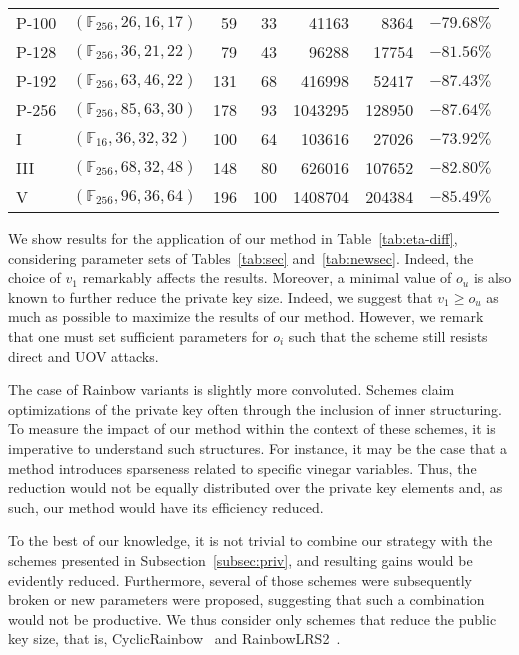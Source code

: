 \documentclass[12pt, a4paper, oneside]{memoir}
\theoremstyle{definition}
\begin{document}
\begin{table}[htbp]
\begin{tabular}{*{2}{l}*{5}{r}}
    P-100 & $(\mathbb{F}_{256}, 26, 16, 17)$ &  59 &  33 & \num{   41163} & \num{   8364} & $-79.68\%$ \\
    P-128 & $(\mathbb{F}_{256}, 36, 21, 22)$ &  79 &  43 & \num{   96288} & \num{  17754} & $-81.56\%$ \\
    P-192 & $(\mathbb{F}_{256}, 63, 46, 22)$ & 131 &  68 & \num{  416998} & \num{  52417} & $-87.43\%$ \\
    P-256 & $(\mathbb{F}_{256}, 85, 63, 30)$ & 178 &  93 & \num{ 1043295} & \num{ 128950} & $-87.64\%$ \\
    I     & $(\mathbb{F}_{ 16}, 36, 32, 32)$ & 100 &  64 & \num{  103616} & \num{  27026} & $-73.92\%$ \\
    III   & $(\mathbb{F}_{256}, 68, 32, 48)$ & 148 &  80 & \num{  626016} & \num{ 107652} & $-82.80\%$ \\
    V     & $(\mathbb{F}_{256}, 96, 36, 64)$ & 196 & 100 & \num{ 1408704} & \num{ 204384} & $-85.49\%$ \\
    \bottomrule
  \end{tabular}
\end{table}

We show results for the application of our method in Table~\ref{tab:eta-diff}, considering parameter sets of Tables~\ref{tab:sec} and~\ref{tab:newsec}. Indeed, the choice of $v_{1}$ remarkably affects the results. Moreover, a minimal value of $o_{u}$ is also known to further reduce the private key size. Indeed, we suggest that $v_{1} \geq o_{u}$ as much as possible to maximize the results of our method. However, we remark that one must set sufficient parameters for $o_{i}$ such that the scheme still resists direct and UOV attacks.

The case of Rainbow variants is slightly more convoluted. Schemes claim optimizations of the private key often through the inclusion of inner structuring. To measure the impact of our method within the context of these schemes, it is imperative to understand such structures. For instance, it may be the case that a method introduces sparseness related to specific vinegar variables. Thus, the reduction would not be equally distributed over the private key elements and, as such, our method would have its efficiency reduced.

To the best of our knowledge, it is not trivial to combine our strategy with the schemes presented in Subsection~\ref{subsec:priv}, and resulting gains would be evidently reduced. Furthermore, several of those schemes were subsequently broken or new parameters were proposed, suggesting that such a combination would not be productive. We thus consider only schemes that reduce the public key size, that is, CyclicRainbow~\cite{Petzoldt:201012} and RainbowLRS2~\cite[Sec.~9.2]{Petzoldt:201307}.
\end{document}
